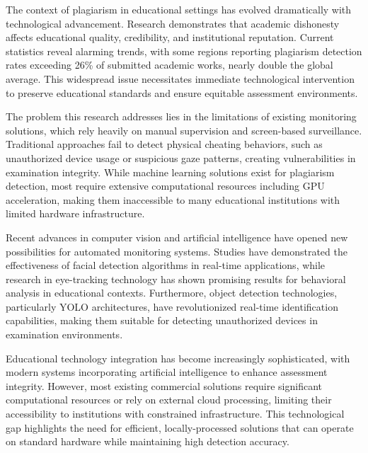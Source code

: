 \documentclass[conference]{IEEEtran}
\begin{document}
The context of plagiarism in educational settings has evolved dramatically with technological advancement. Research demonstrates that academic dishonesty affects educational quality, credibility, and institutional reputation\cite{pelican2021plagiat}. Current statistics reveal alarming trends, with some regions reporting plagiarism detection rates exceeding 26\% of submitted academic works, nearly double the global average\cite{brainard2018massive}. This widespread issue necessitates immediate technological intervention to preserve educational standards and ensure equitable assessment environments.

The problem this research addresses lies in the limitations of existing monitoring solutions, which rely heavily on manual supervision and screen-based surveillance. Traditional approaches fail to detect physical cheating behaviors, such as unauthorized device usage or suspicious gaze patterns, creating vulnerabilities in examination integrity\cite{dilini2021cheating}. While machine learning solutions exist for plagiarism detection\cite{russell2020artificial}, most require extensive computational resources including GPU acceleration, making them inaccessible to many educational institutions with limited hardware infrastructure.

Recent advances in computer vision and artificial intelligence have opened new possibilities for automated monitoring systems. Studies have demonstrated the effectiveness of facial detection algorithms in real-time applications\cite{hasan2021face}, while research in eye-tracking technology has shown promising results for behavioral analysis in educational contexts\cite{el2023drowsiness}. Furthermore, object detection technologies, particularly YOLO architectures, have revolutionized real-time identification capabilities\cite{wang2022object}, making them suitable for detecting unauthorized devices in examination environments.

Educational technology integration has become increasingly sophisticated, with modern systems incorporating artificial intelligence to enhance assessment integrity\cite{honorlock2023detecting}. However, most existing commercial solutions require significant computational resources or rely on external cloud processing, limiting their accessibility to institutions with constrained infrastructure\cite{proctoru}. This technological gap highlights the need for efficient, locally-processed solutions that can operate on standard hardware while maintaining high detection accuracy.
\end{document}
